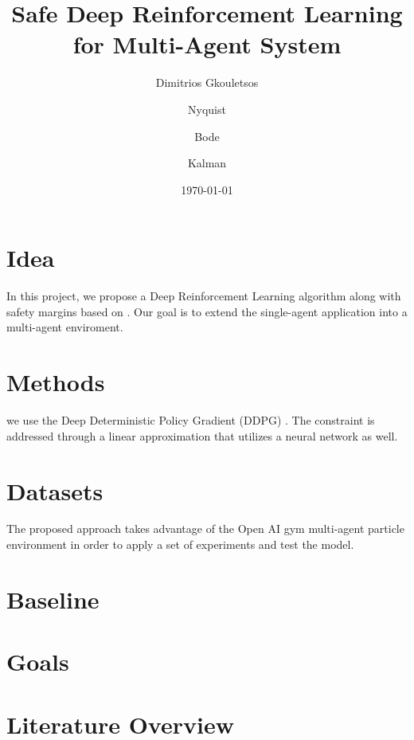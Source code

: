 \documentclass[12pt,oneside]{article}
\title{\Huge\textbf{Safe Deep Reinforcement Learning for Multi-Agent System }}
\author{
  Dimitrios Gkouletsos\\
  \and
  Nyquist\\
  \and
  Bode\\
  \and
  Kalman\\
}
\date{\today}
\begin{document}
\maketitle

\section{Idea}
In this project, we propose a Deep Reinforcement Learning algorithm along with safety margins based on \cite{SafeExploration}. Our goal is to extend the 
single-agent application \cite{SafeExploration} into a multi-agent enviroment. 

\section{Methods}
we use the Deep Deterministic Policy Gradient (DDPG) \cite{DDPG}. 
The constraint is addressed through a linear approximation that utilizes a neural network as well. 

\section{Datasets}
The proposed approach takes advantage of the Open AI gym multi-agent particle environment \cite{environment} in order to apply a set of experiments and 
test the model. 
\section{Baseline}

\section{Goals}

\section{Literature Overview}

\newpage

\end{document}
